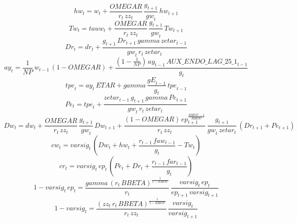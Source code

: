 \begin{dmath}
{hw}_{t}={w}_{t}+\frac{{OMEGAR}}{{r}_{t}\, {zz}_{t}}\, \frac{{g}_{t+1}}{{gw}_{t}}\, {hw}_{t+1}
\end{dmath}
\begin{dmath}
{Tw}_{t}={tauw}_{t}+\frac{{OMEGAR}}{{r}_{t}\, {zz}_{t}}\, \frac{{g}_{t+1}}{{gw}_{t}}\, {Tw}_{t+1}
\end{dmath}
\begin{dmath}
{Dr}_{t}={dr}_{t}+\frac{{g}_{t+1}\, {Dr}_{t+1}\, {gamma}\, {zetar}_{t-1}}{{gw}_{t}\, {r}_{t}\, {zetar}_{t}}
\end{dmath}
\begin{dmath}
{ay}_{t}=\frac{1}{{NP}}\, {w}_{t-1}\, \left(1-{OMEGAR}\right)+\frac{\left(1-\frac{1}{{NP}}\right)\, {ay}_{t-1}\, {AUX\_ENDO\_LAG\_25\_1}_{t-1}}{{g}_{t}}
\end{dmath}
\begin{dmath}
{tpe}_{t}={ay}_{t}\, {ETAR}+{gamma}\, \frac{{gE}_{t-1}}{{g}_{t}}\, {tpe}_{t-1}
\end{dmath}
\begin{dmath}
{Pe}_{t}={tpe}_{t}+\frac{{zetar}_{t-1}\, {g}_{t+1}\, {gamma}\, {Pe}_{t+1}}{{gw}_{t}\, {r}_{t}\, {zetar}_{t}}
\end{dmath}
\begin{dmath}
{Dw}_{t}={dw}_{t}+\frac{{OMEGAR}}{{r}_{t}\, {zz}_{t}}\, \frac{{g}_{t+1}}{{gw}_{t}}\, {Dw}_{t+1}+\frac{\left(1-{OMEGAR}\right)\, {ep}_{t+1}^{\frac{{RHOU}-1}{{RHOU}}}}{{r}_{t}\, {zz}_{t}}\, \frac{{g}_{t+1}}{{gw}_{t}\, {zetar}_{t}}\, \left({Dr}_{t+1}+{Pe}_{t+1}\right)
\end{dmath}
\begin{dmath}
{cw}_{t}={varsig}_{t}\, \left({Dw}_{t}+{hw}_{t}+\frac{{r}_{t-1}\, {faw}_{t-1}}{{g}_{t}}-{Tw}_{t}\right)
\end{dmath}
\begin{dmath}
{cr}_{t}={varsig}_{t}\, {ep}_{t}\, \left({Pe}_{t}+{Dr}_{t}+\frac{{r}_{t-1}\, {far}_{t-1}}{{g}_{t}}\right)
\end{dmath}
\begin{dmath}
1-{varsig}_{t}\, {ep}_{t}=\frac{{gamma}\, \left({r}_{t}\, {BBETA}\right)^{\frac{1}{1-{RHOU}}}}{{r}_{t}}\, \frac{{varsig}_{t}\, {ep}_{t}}{{ep}_{t+1}\, {varsig}_{t+1}}
\end{dmath}
\begin{dmath}
1-{varsig}_{t}=\frac{\left({zz}_{t}\, {r}_{t}\, {BBETA}\right)^{\frac{1}{1-{RHOU}}}}{{r}_{t}\, {zz}_{t}}\, \frac{{varsig}_{t}}{{varsig}_{t+1}}
\end{dmath}
